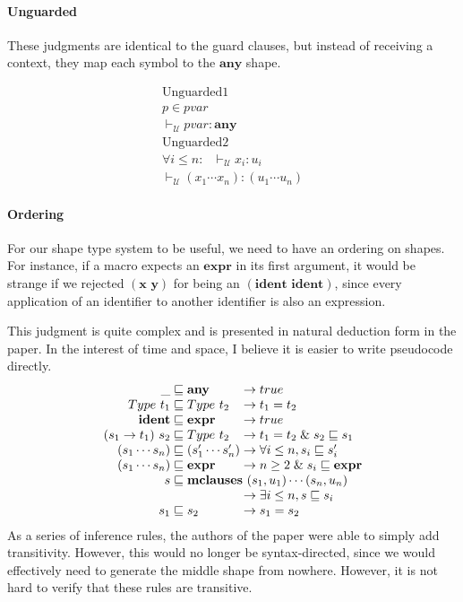 \documentclass[11pt]{article}
\begin{document}
\paragraph{Unguarded}

These judgments are identical to the guard clauses, but instead of receiving a context, they map each symbol to the $\textbf{any}$ shape. 

\[\begin{array}{c}
\text{Unguarded1}\\
p \in pvar \\\hline
 \vdash_\mathcal U pvar : \textbf{any}\\[0.25cm]
\text{Unguarded2}\\
\forall i \le n : \ \ \ \vdash_\mathcal U x_i : u_i \\\hline
\vdash_\mathcal U (x_1 \cdots x_n) : (u_1 \cdots u_n)
\end{array}\]

\paragraph{Ordering}

For our shape type system to be useful, we need to have an ordering on shapes. For instance, if a macro expects an $\textbf{expr}$ in its first argument, it would be strange if we rejected $(\textbf{x y})$ for being an $(\textbf{ident ident})$, since every application of an identifier to another identifier is also an expression. 

This judgment is quite complex and is presented in natural deduction form in the paper. In the interest of time and space, I believe it is easier to write pseudocode directly. 
\[\arraycolsep=1.4pt
\begin{array}{rcll}
\_ &\sqsubseteq& \textbf{any}& \rightarrow true\\
    Type\ t_1 &\sqsubseteq& Type\ t_2 &\rightarrow t_1 = t_2 \\
    \textbf{ident} &\sqsubseteq& \textbf{expr} &\rightarrow true \\
    (s_1 \rightarrow t_1)\ s_2 &\sqsubseteq& Type\ t_2 &\rightarrow t_1 = t_2 \mathrel\& s_2 \sqsubseteq s_1 \\
    (s_1 \cdots s_n) &\sqsubseteq& (s'_1 \cdots s'_n) &\rightarrow \forall i \leq n,  s_i \sqsubseteq s_i'\\
    (s_1 \cdots s_n) &\sqsubseteq& \textbf{expr} &\rightarrow n \geq 2 \mathrel \& s_i \sqsubseteq \textbf{expr}\\
    s &\sqsubseteq& \multicolumn{2}{l}{\textbf{mclauses}\ (s_1,u_1) \cdots (s_n,u_n) }\\
     & & & \rightarrow \exists i \leq n, s \sqsubseteq s_i \\
    s_1 &\sqsubseteq& s_2 &\rightarrow s_1 = s_2
\end{array}\]
As a series of inference rules, the authors of the paper were able to simply add transitivity. However, this would no longer be syntax-directed, since we would effectively need to generate the middle shape from nowhere. However, it is not hard to verify that these rules are transitive.
\end{document}

